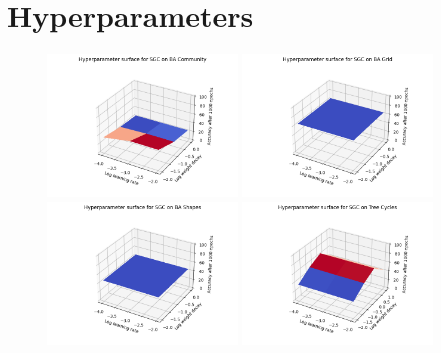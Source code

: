 \chapter{Hyperparameters}
\label{app:hyperparameters}







\begin{figure}
    \centering
    \includegraphics[width=0.45\textwidth]{figures/SGC-BA-Community-surface}
    \includegraphics[width=0.45\textwidth]{figures/SGC-BA-Grid-surface}
    \includegraphics[width=0.45\textwidth]{figures/SGC-BA-Shapes-surface}
    \includegraphics[width=0.45\textwidth]{figures/SGC-Tree-Cycles-surface}

\end{figure}

